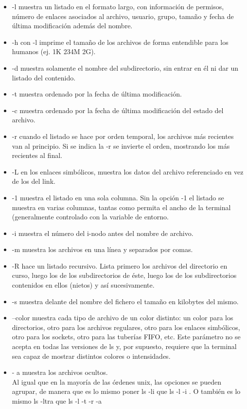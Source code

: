 \documentclass{article}
\begin{document}
\begin{itemize}

\item -l muestra un listado en el formato largo, con información de permisos, número de enlaces asociados al archivo, usuario, grupo, tamaño y fecha de última modificación además del nombre.
\item -h con -l imprime el tamaño de los archivos de forma entendible para los humanos (ej. 1K 234M 2G).
\item -d muestra solamente el nombre del subdirectorio, sin entrar en él ni dar un listado del contenido.
\item -t muestra ordenado por la fecha de última modificación.
\item -c muestra ordenado por la fecha de última modificación del estado del archivo.
\item -r cuando el listado se hace por orden temporal, los archivos más recientes van al principio. Si se indica la -r se invierte el orden, mostrando los más recientes al final.
\item -L en los enlaces simbólicos, muestra los datos del archivo referenciado en vez de los del link.
\item -1 muestra el listado en una sola columna. Sin la opción -1 el listado se muestra en varias columnas, tantas como permita el ancho de la terminal (generalmente controlado con la variable de entorno.
\item -i muestra el número del i-nodo antes del nombre de archivo.
\item -m muestra los archivos en una línea y separados por comas.
\item -R hace un listado recursivo. Lista primero los archivos del directorio en curso, luego los de los subdirectorios de éste, luego los de los subdirectorios contenidos en ellos (nietos) y así sucesivamente.
\item -s muestra delante del nombre del fichero el tamaño en kilobytes del mismo.
\item --color muestra cada tipo de archivo de un color distinto: un color para los directorios, otro para los archivos regulares, otro para los enlaces simbólicos, otro para los sockets, otro para las tuberías FIFO, etc. Este parámetro no se acepta en todas las versiones de ls y, por supuesto, requiere que la terminal sea capaz de mostrar distintos colores o intensidades.
\item - a muestra los archivos ocultos.
\\
Al igual que en la mayoría de las órdenes unix, las opciones se pueden agrupar, de manera que es lo mismo poner ls -li que ls -l -i . O también es lo mismo ls -ltra que ls -l -t -r -a


\end{itemize}
\end{document}
